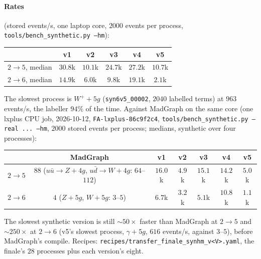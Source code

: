 \documentclass[11pt]{article}
\newcommand{\code}[1]{\texttt{#1}}
\begin{document}
\paragraph{Rates} (stored events/s, one laptop core, $2000$ events per process, \code{tools/bench\_synthetic.py --hm}):
\begin{center}\small
\begin{tabular}{lccccc}
 & v1 & v2 & v3 & v4 & v5 \\ \hline
$2\to5$, median & $30.8$k & $10.1$k & $24.7$k & $27.2$k & $10.7$k \\
$2\to6$, median & $14.9$k & $6.0$k & $9.8$k & $19.1$k & $2.1$k \\
\end{tabular}
\end{center}
The slowest process is $W^++5g$ (\code{syn6v5\_00002}, $2040$ labelled terms) at $963$ events/s, the labeller $94\%$ of
the time. Against MadGraph on the same core (one lxplus CPU job, 2026-10-12, \code{FA-lxplus-86c9f2c4},
\code{tools/bench\_synthetic.py --real ... --hm}, $2000$ stored events per process; medians, synthetic over four processes):
\begin{center}\small
\begin{tabular}{lcccccc}
 & MadGraph & v1 & v2 & v3 & v4 & v5 \\ \hline
$2\to5$ & $88$ ($u\bar u\to Z+4g$, $u\bar d\to W+4g$: $64$--$112$) & $16.0$k & $4.9$k & $15.1$k & $14.2$k & $5.0$k \\
$2\to6$ & $4$ ($Z+5g$, $W+5g$: $3$--$5$) & $6.7$k & $3.2$k & $5.1$k & $10.8$k & $1.1$k \\
\end{tabular}
\end{center}
The slowest synthetic version is still $\sim\!50\times$ faster than MadGraph at $2\to5$ and $\sim\!250\times$ at $2\to6$
(v5's slowest process, $\gamma+5g$, $616$ events/s, against $3$--$5$), before MadGraph's compile. Recipes: \code{recipes/transfer\_finale\_synhm\_v<V>.yaml},
the finale's $28$ processes plus each version's eight.
\end{document}
